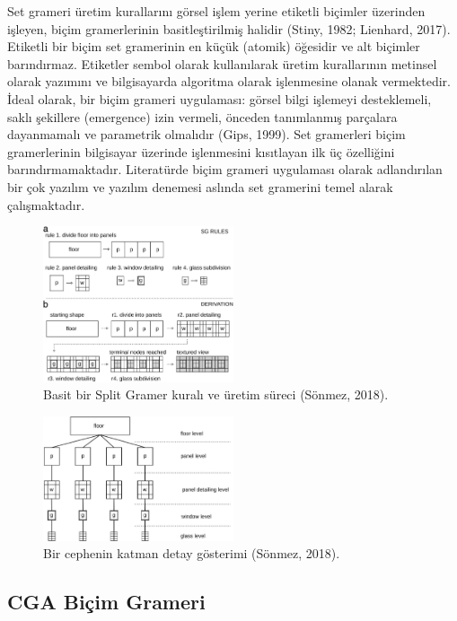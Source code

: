 \documentclass[12pt,turkish,a4paperpaper,]{report}
\begin{document}
Set grameri üretim kurallarını görsel işlem yerine etiketli biçimler
üzerinden işleyen, biçim gramerlerinin basitleştirilmiş halidir (Stiny,
1982; Lienhard, 2017). Etiketli bir biçim set gramerinin en küçük
(atomik) öğesidir ve alt biçimler barındırmaz. Etiketler sembol olarak
kullanılarak üretim kurallarının metinsel olarak yazımını ve
bilgisayarda algoritma olarak işlenmesine olanak vermektedir. İdeal
olarak, bir biçim grameri uygulaması: görsel bilgi işlemeyi
desteklemeli, saklı şekillere (emergence) izin vermeli, önceden
tanımlanmış parçalara dayanmamalı ve parametrik olmalıdır (Gips, 1999).
Set gramerleri biçim gramerlerinin bilgisayar üzerinde işlenmesini
kısıtlayan ilk üç özelliğini barındırmamaktadır. Literatürde biçim
grameri uygulaması olarak adlandırılan bir çok yazılım ve yazılım
denemesi aslında set gramerini temel alarak çalışmaktadır.

\begin{figure}
\centering
\includegraphics[width=0.5\textwidth,height=\textheight]{source/figures/splitGrammar.jpg}
\caption{Basit bir Split Gramer kuralı ve üretim süreci (Sönmez, 2018).
\label{splitGrammar}}
\end{figure}

\begin{figure}
\centering
\includegraphics[width=0.5\textwidth,height=\textheight]{source/figures/splitGrammar2.jpg}
\caption{Bir cephenin katman detay gösterimi (Sönmez, 2018).}
\end{figure}

\hypertarget{cga-biuxe7im-grameri}{%
\subsection{CGA Biçim Grameri}\label{cga-biuxe7im-grameri}}
\end{document}
